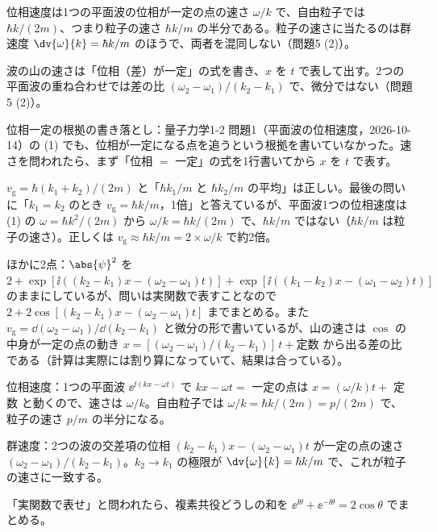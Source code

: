 \begin{daiji}
  \item 位相速度は1つの平面波の位相が一定の点の速さ $\omega/k$ で、自由粒子では $\hbar k/(2m)$、つまり粒子の速さ $\hbar k/m$ の半分である。粒子の速さに当たるのは群速度 $\dv{\omega}{k}=\hbar k/m$ のほうで、両者を混同しない（問題5 (2)）。
  \item 波の山の速さは「位相（差）が一定」の式を書き、$x$ を $t$ で表して出す。2つの平面波の重ね合わせでは差の比 $(\omega_{2}-\omega_{1})/(k_{2}-k_{1})$ で、微分ではない（問題5 (2)）。
\end{daiji}
\begin{maemo}
  \item 位相一定の根拠の書き落とし：量子力学1-2 問題1（平面波の位相速度，2026-10-14）の (1) でも、位相が一定になる点を追うという根拠を書いていなかった。速さを問われたら、まず「位相 $=$ 一定」の式を1行書いてから $x$ を $t$ で表す。
\end{maemo}
\begin{kotaeran}
   $v_{\mathrm{g}}=\hbar(k_{1}+k_{2})/(2m)$ と「$\hbar k_{1}/m$ と $\hbar k_{2}/m$ の平均」は正しい。最後の問いに「$k_{1}=k_{2}$ のとき $v_{\mathrm{g}}=\hbar k/m$，1倍」と答えているが、平面波1つの位相速度は (1) の $\omega=\hbar k^{2}/(2m)$ から $\omega/k=\hbar k/(2m)$ で、$\hbar k/m$ ではない（$\hbar k/m$ は粒子の速さ）。正しくは $v_{\mathrm{g}}\approx\hbar k/m=2\times\omega/k$ で約2倍。

  ほかに2点：$\abs{\psi}^{2}$ を $2+\exp[\ii((k_{2}-k_{1})x-(\omega_{2}-\omega_{1})t)]+\exp[\ii((k_{1}-k_{2})x-(\omega_{1}-\omega_{2})t)]$ のままにしているが、問いは実関数で表すことなので $2+2\cos[(k_{2}-k_{1})x-(\omega_{2}-\omega_{1})t]$ までまとめる。また $v_{\mathrm{g}}=\dd(\omega_{2}-\omega_{1})/\dd(k_{2}-k_{1})$ と微分の形で書いているが、山の速さは $\cos$ の中身が一定の点の動き $x=[(\omega_{2}-\omega_{1})/(k_{2}-k_{1})]\,t+\text{定数}$ から出る差の比である（計算は実際には割り算になっていて、結果は合っている）。
\end{kotaeran}
\begin{rikai}
  \item 位相速度：1つの平面波 $\ee^{\ii(kx-\omega t)}$ で $kx-\omega t=$ 一定の点は $x=(\omega/k)t+$ 定数 と動くので、速さは $\omega/k$。自由粒子では $\omega/k=\hbar k/(2m)=p/(2m)$ で、粒子の速さ $p/m$ の半分になる。
  \item 群速度：2つの波の交差項の位相 $(k_{2}-k_{1})x-(\omega_{2}-\omega_{1})t$ が一定の点の速さ $(\omega_{2}-\omega_{1})/(k_{2}-k_{1})$。$k_{2}\to k_{1}$ の極限が $\dv{\omega}{k}=\hbar k/m$ で、これが粒子の速さに一致する。
  \item 「実関数で表せ」と問われたら、複素共役どうしの和を $\ee^{\ii\theta}+\ee^{-\ii\theta}=2\cos\theta$ でまとめる。
\end{rikai}
